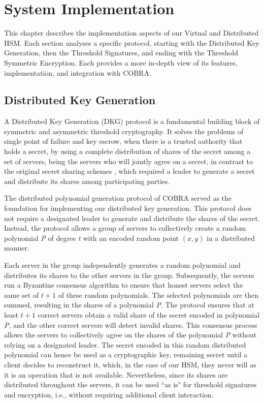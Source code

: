 \chapter{System Implementation} \label{chap:implementation}

This chapter describes the implementation aspects of our Virtual and Distributed HSM. Each section analyses a specific protocol, starting with the Distributed Key Generation, then the Threshold Signatures, and ending with the Threshold Symmetric Encryption. Each provides a more in-depth view of its features, implementation, and integration with COBRA.

\section{Distributed Key Generation} \label{sec:distributedkeygen}

A Distributed Key Generation (DKG) protocol is a fundamental building block of symmetric and asymmetric threshold cryptography. It solves the problems of single point of failure and key escrow, when there is a trusted authority that holds a secret, by using a complete distribution of shares of the secret among a set of servers, being the servers who will jointly agree on a secret, in contrast to the original secret sharing schemes \cite{shamir}, which required a leader to generate a secret and distribute its shares among participating parties.

The distributed polynomial generation protocol of COBRA \cite{cobra} served as the foundation for implementing our distributed key generation. This protocol does not require a designated leader to generate and distribute the shares of the secret. Instead, the protocol allows a group of servers to collectively create a random polynomial \textit{P} of degree \textit{t} with an encoded random point $(x, y)$ in a distributed manner. 

Each server in the group independently generates a random polynomial and distributes its shares to the other servers in the group. Subsequently, the servers run a Byzantine consensus algorithm to ensure that honest servers select the same set of $t + 1$ of these random polynomials. The selected polynomials are then summed, resulting in the shares of a polynomial \textit{P}. The protocol ensures that at least $t + 1$ correct servers obtain a valid share of the secret encoded in polynomial \textit{P}, and the other correct servers will detect invalid shares. This consensus process allows the servers to collectively agree on the shares of the polynomial \textit{P} without relying on a designated leader. The secret encoded in this random distributed polynomial can hence be used as a cryptographic key, remaining secret until a client decides to reconstruct it, which, in the case of our HSM, they never will as it is an operation that is not available. Nevertheless, since its shares are distributed throughout the servers, it can be used ``as is" for threshold signatures and encryption, i.e., without requiring additional client interaction.

